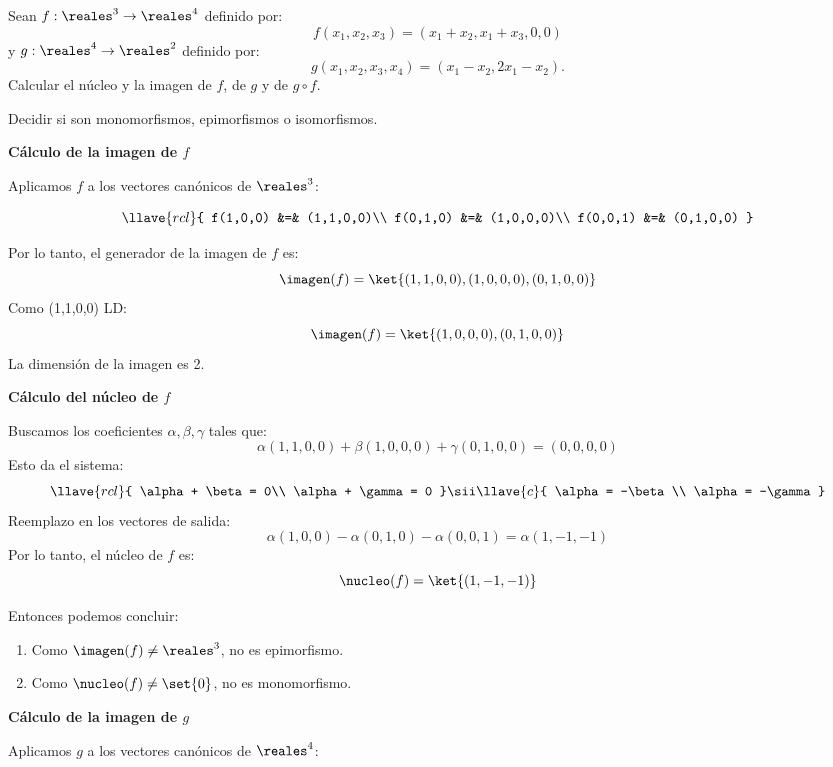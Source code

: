 \begin{enunciado}{\ejercicio}
  Sean $ f: \reales^3 \to \reales^4 $ definido por:
  $$
    f(x_1, x_2, x_3) = (x_1 + x_2, x_1 + x_3, 0, 0)
  $$
  y $ g: \reales^4 \to \reales^2 $ definido por:
  $$
    g(x_1, x_2, x_3, x_4) = (x_1 - x_2, 2x_1 - x_2).
  $$
  Calcular el núcleo y la imagen de $f$, de $g$ y de $g \circ f$.

  Decidir si son monomorfismos, epimorfismos o isomorfismos.
\end{enunciado}

\medskip

\textbf{Cálculo de la imagen de $f$}

Aplicamos $f$ a los vectores canónicos de $\reales^3$:

$$
  \llave{rcl}{
    f(1,0,0)  &=& (1,1,0,0)\\
    f(0,1,0) &=& (1,0,0,0)\\
    f(0,0,1) &=& (0,1,0,0)
  }
$$

Por lo tanto, el generador de la imagen de $ f $ es:
$$ \imagen(f) = \ket{(1,1,0,0), (1,0,0,0), (0,1,0,0)} $$
Como (1,1,0,0) LD:
$$
  \imagen(f) = \ket{(1,0,0,0), (0,1,0,0)}
$$
La dimensión de la imagen es 2.
\medskip

\textbf{Cálculo del núcleo de $f$}

Buscamos los coeficientes $ \alpha, \beta, \gamma $ tales que:
$$
  \alpha(1,1,0,0) + \beta(1,0,0,0) + \gamma(0,1,0,0) = (0,0,0,0)
$$
Esto da el sistema:
$$
  \llave{rcl}{

    \alpha + \beta = 0\\
    \alpha + \gamma = 0
  }
  \sii
  \llave{c}{
    \alpha = -\beta \\
    \alpha = -\gamma
  }
$$
Reemplazo en los vectores de salida:
$$
  \alpha(1,0,0) - \alpha(0,1,0) - \alpha(0,0,1) = \alpha(1,-1,-1)
$$
Por lo tanto, el núcleo de $f$ es:
$$
  \nucleo(f) = \ket{(1,-1,-1)}
$$

Entonces podemos concluir:
\begin{enumerate}[label=\roman*)]
  \item Como $ \imagen(f) \neq \reales^3 $, no es epimorfismo.
  \item Como $ \nucleo(f) \neq \set{0} $, no es monomorfismo.
\end{enumerate}

\medskip

\textbf{Cálculo de la imagen de $g$}

Aplicamos $g$ a los vectores canónicos de $\reales^4$:

